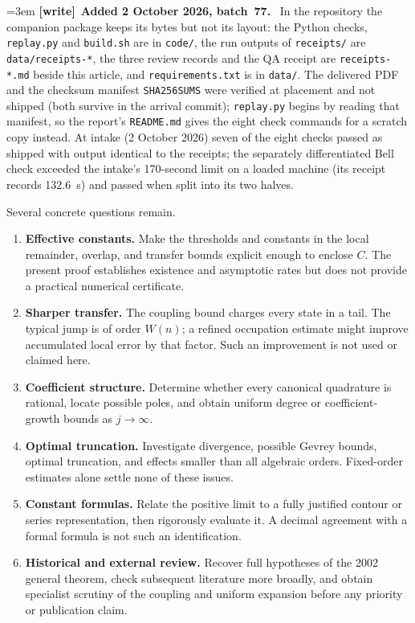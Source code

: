 \documentclass[11pt,letterpaper]{article}
\theoremstyle{remark}\newtheorem{remark}[theorem]{Remark}
\newenvironment{writenote}[1][]{\par\smallskip\begingroup\small\emergencystretch=3em
 \noindent\textbf{[write]}\if\relax\detokenize{#1}\relax\else~\textbf{#1.}\fi\ }%
 {\par\endgroup\smallskip}
\begin{document}
\begin{writenote}[Added 2 October 2026, batch~77]
In the repository the companion package keeps its bytes but not its layout: the
Python checks, \texttt{replay.py} and \texttt{build.sh} are in \texttt{code/},
the run outputs of \texttt{receipts/} are \texttt{data/receipts-*}, the three
review records and the QA receipt are \texttt{receipts-*.md} beside this
article, and \texttt{requirements.txt} is in \texttt{data/}. The delivered PDF
and the checksum manifest \texttt{SHA256SUMS} were verified at placement and not
shipped (both survive in the arrival commit); \texttt{replay.py} begins by
reading that manifest, so the report's \texttt{README.md} gives the eight
check commands for a scratch copy instead. At intake (2 October 2026) seven of
the eight checks passed as shipped with output identical to the receipts; the
separately differentiated Bell check exceeded the intake's 170-second limit on
a loaded machine (its receipt records 132.6~s) and passed when split into its
two halves.
\end{writenote}

Several concrete questions remain.
\begin{enumerate}
\item \textbf{Effective constants.} Make the thresholds and constants in the local remainder, overlap, and transfer bounds explicit enough to enclose $C$. The present proof establishes existence and asymptotic rates but does not provide a practical numerical certificate.
\item \textbf{Sharper transfer.} The coupling bound charges every state in a tail. The typical jump is of order $W(n)$; a refined occupation estimate might improve accumulated local error by that factor. Such an improvement is not used or claimed here.
\item \textbf{Coefficient structure.} Determine whether every canonical quadrature is rational, locate possible poles, and obtain uniform degree or coefficient-growth bounds as $j\to\infty$.
\item \textbf{Optimal truncation.} Investigate divergence, possible Gevrey bounds, optimal truncation, and effects smaller than all algebraic orders. Fixed-order estimates alone settle none of these issues.
\item \textbf{Constant formulas.} Relate the positive limit to a fully justified contour or series representation, then rigorously evaluate it. A decimal agreement with a formal formula is not such an identification.
\item \textbf{Historical and external review.} Recover full hypotheses of the 2002 general theorem, check subsequent literature more broadly, and obtain specialist scrutiny of the coupling and uniform expansion before any priority or publication claim.
\end{enumerate}
\end{document}
